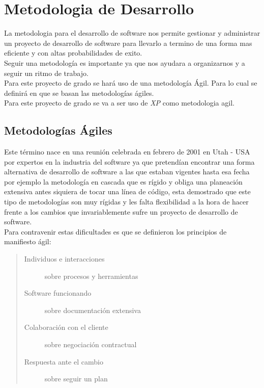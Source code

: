 
  \section{Metodologia de Desarrollo}
  \label{sec:metodologia_de_desarrollo}
    La metodologia para el desarrollo de software nos permite gestionar y administrar un proyecto de desarrollo de software para llevarlo a termino de una forma mas eficiente y con altas probabilidades de exito.\\
    Seguir una metodología es importante ya que nos ayudara a organizarnos y a seguir un ritmo de trabajo.\\
    Para este proyecto de grado se hará uso de una metodología Ágil. Para lo cual se definirá en que se basan las metodologías ágiles.\\

    Para este proyecto de grado se va a ser uso de \emph{XP} como metodologia agil.\\

    \subsection{Metodologías \'Agiles}
    \label{sub:metodologias_agiles}

    Este término nace en una reunión celebrada en febrero de 2001 en Utah - USA por expertos en la industria del software ya que pretendían encontrar una forma alternativa de desarrollo de software a las que estaban vigentes hasta esa fecha por ejemplo la metodología en cascada que es rígido y obliga una planeación extensiva antes siquiera de tocar una línea de código, esta demostrado que este tipo de metodologías son muy rígidas y les falta flexibilidad a la hora de hacer frente a los cambios que invariablemente sufre un proyecto de desarrollo de software.\\



    Para contravenir estas dificultades es que se definieron los principios de manifiesto ágil:

    \begin{quote}
      \begin{description}
        \item[Individuos e interacciones] sobre procesos y herramientas
        \item[Software funcionando] sobre documentación extensiva
        \item[Colaboración con el cliente] sobre negociación contractual
        \item[Respuesta ante el cambio] sobre seguir un plan
      \end{description}
    \end{quote}

